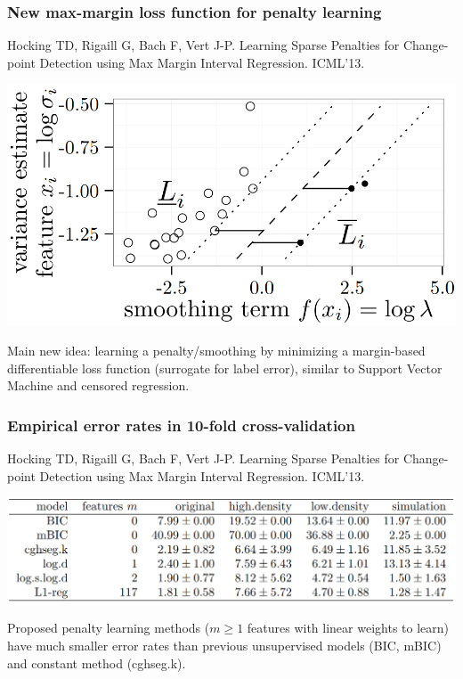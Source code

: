 \documentclass[t]{beamer}
\begin{document}
\begin{frame}
  \frametitle{New max-margin loss function for penalty learning}
  {\scriptsize Hocking TD, Rigaill G, Bach F, Vert J-P. Learning Sparse Penalties
  for Change-point Detection using Max Margin Interval
  Regression. ICML'13.}

  \includegraphics[width=\textwidth]{figure-ICML13-margin}

  Main new idea: learning a penalty/smoothing by minimizing a
  margin-based differentiable loss function (surrogate for label
  error), similar to Support Vector Machine and censored regression.
\end{frame}

\begin{frame}
  \frametitle{Empirical error rates in 10-fold cross-validation}
  {\scriptsize Hocking TD, Rigaill G, Bach F, Vert J-P. Learning Sparse Penalties
  for Change-point Detection using Max Margin Interval
  Regression. ICML'13.}

  \includegraphics[width=\textwidth]{table-ICML13-error-rates}

  Proposed penalty learning methods ($m\geq 1$ features with linear
  weights to learn) have much smaller error rates than previous
  unsupervised models (BIC, mBIC) and constant method (cghseg.k).
\end{frame}
\end{document}
